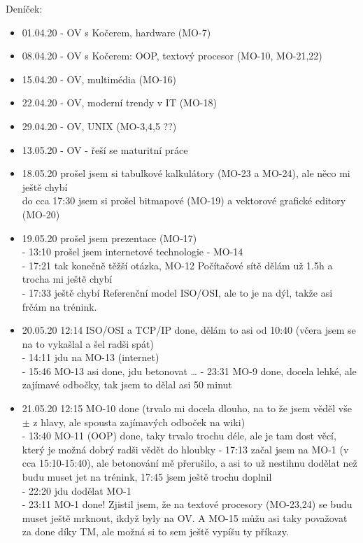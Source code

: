 \documentclass[12pt]{article}
\begin{document}
\rightline{\today}
Deníček:
\begin{itemize}
\item 01.04.20 - OV s Kočerem, hardware (MO-7)
\item 08.04.20 - OV s Kočerem: OOP, textový procesor (MO-10, MO-21,22)
\item 15.04.20 - OV, multimédia (MO-16)
\item 22.04.20 - OV, moderní trendy v IT (MO-18)
\item 29.04.20 - OV, UNIX (MO-3,4,5 ??)
\item 13.05.20 - OV - řeší se maturitní práce
\item 18.05.20 prošel jsem si tabulkové kalkulátory (MO-23 a MO-24), ale něco mi ještě chybí\\
do cca 17:30 jsem si prošel bitmapové (MO-19) a vektorové grafické editory (MO-20)
\item 19.05.20 prošel jsem prezentace (MO-17)\\
 - 13:10 prošel jsem internetové technologie - MO-14\\
 - 17:21 tak konečně  těžší otázka, MO-12 Počítačové sítě dělám už 1.5h a trocha mi ještě chybí\\
 - 17:33 ještě chybí Referenční model ISO/OSI, ale to je na dýl, takže asi frčám na trénink.
\item 20.05.20 12:14 ISO/OSI a TCP/IP done, dělám to asi od 10:40 (včera jsem se na to vykašlal a šel radši spát)\\
 - 14:11 jdu na MO-13 (internet)\\
 - 15:46 MO-13 asi done, jdu betonovat \dots
 - 23:31 MO-9 done, docela lehké, ale zajímavé odbočky, tak jsem to dělal asi 50 minut
\item 21.05.20 12:15 MO-10 done (trvalo mi docela dlouho, na to že jsem věděl vše $\pm$ z hlavy, ale spousta zajímavých odboček na wiki)\\
 - 13:40 MO-11 (OOP) done, taky trvalo trochu déle, ale je tam dost věcí, který je možná dobrý radši vědět do hloubky
 - 17:13 začal jsem na MO-1 (v cca 15:10-15:40), ale betonování mě přerušilo, a asi to už nestihnu dodělat než budu muset jet na trénink,  17:45 jsem ještě trochu doplnil\\
 - 22:20 jdu dodělat MO-1\\
 - 23:11 MO-1 done! Zjistil jsem, že na textové procesory (MO-23,24) se budu muset ještě mrknout, ikdyž byly na OV. A MO-15 můžu asi taky považovat za done díky TM, ale možná si to sem ještě vypíšu ty příkazy.
\end{itemize}
\end{document}
